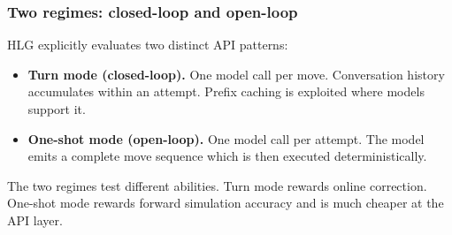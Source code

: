 \subsubsection{Two regimes: closed-loop and open-loop}
\label{sec:regimes}

HLG explicitly evaluates two distinct API patterns:
\begin{itemize}[leftmargin=1.5em]
    \item \textbf{Turn mode (closed-loop).} One model call per move. Conversation
      history accumulates within an attempt. Prefix caching is exploited where models
      support it.
    \item \textbf{One-shot mode (open-loop).} One model call per attempt. The model
      emits a complete move sequence which is then executed deterministically.
\end{itemize}
The two regimes test different abilities. Turn mode rewards online correction. One-shot
mode rewards forward simulation accuracy and is much cheaper at the API layer.
